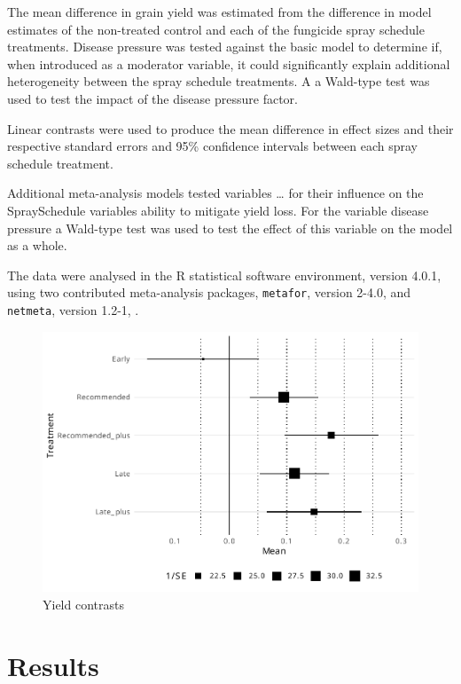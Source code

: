 \documentclass[agronomy,article,submit,moreauthors,pdftex]{mdpi}
\begin{document}
The mean difference in grain yield was estimated from the difference in model estimates of the non-treated control and each of the fungicide spray schedule treatments.
Disease pressure was tested against the basic model to determine if, when introduced as a moderator variable, it could significantly explain additional heterogeneity between the spray schedule treatments.
A a Wald-type test was used to test the impact of the disease pressure factor.

Linear contrasts were used to produce the mean difference in effect sizes and their respective standard errors and 95\% confidence intervals between each spray schedule treatment.

Additional meta-analysis models tested variables \ldots{} for their influence on the SpraySchedule variables ability to mitigate yield loss.
For the variable disease pressure a Wald-type test was used to test the effect of this variable on the model as a whole.

The data were analysed in the R statistical software environment, version 4.0.1, \citep{RCoreTeam2020} using two contributed meta-analysis packages, \texttt{metafor}, version 2-4.0, \citep{Viechtbauer2010} and \texttt{netmeta}, version 1.2-1, \citep{Rucker2020}.

\begin{figure}
\centering
\includegraphics{paper_files/figure-latex/Figure1-1.pdf}
\caption{\label{fig:Figure1}Yield contrasts}
\end{figure}

\hypertarget{results}{%
\section{Results}\label{results}}
\end{document}
